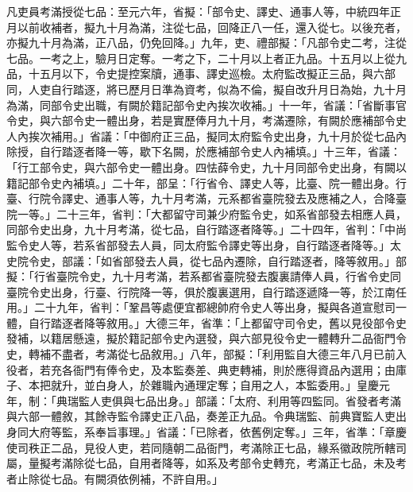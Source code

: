 \begin{pinyinscope}
 凡吏員考滿授從七品：至元六年，省擬：「部令史、譯史、通事人等，中統四年正月以前收補者，擬九十月為滿，注從七品，回降正八一任，還入從七。以後充者，亦擬九十月為滿，正八品，仍免回降。」九年，吏、禮部擬：「凡部令史二考，注從七品。一考之上，驗月日定奪。一考之下，二十月以上者正九品。十五月以上從九品，十五月以下，令史提控案牘，通事、譯史巡檢。太府監改擬正三品，與六部同，人吏自行踏逐，將已歷月日準為資考，似為不倫，擬自改升月日為始，九十月為滿，同部令史出職，有闕於籍記部令史內挨次收補。」十一年，省議：「省斷事官令史，與六部令史一體出身，若是實歷俸月九十月，考滿遷除，有闕於應補部令史人內挨次補用。」省議：「中御府正三品，擬同太府監令史出身，九十月於從七品內除授，自行踏逐者降一等，歇下名闕，於應補部令史人內補填。」十三年，省議：「行工部令史，與六部令史一體出身。四怯薛令史，九十月同部令史出身，有闕以籍記部令史內補填。」二十年，部呈：「行省令、譯史人等，比臺、院一體出身。行臺、行院令譯史、通事人等，九十月考滿，元系都省臺院發去及應補之人，合降臺院一等。」二十三年，省判：「大都留守司兼少府監令史，如系省部發去相應人員，同部令史出身，九十月考滿，從七品，自行踏逐者降等。」二十四年，省判：「中尚監令史人等，若系省部發去人員，同太府監令譯史等出身，自行踏逐者降等。」太史院令史，部議：「如省部發去人員，從七品內遷除，自行踏逐者，降等敘用。」部擬：「行省臺院令史，九十月考滿，若系都省臺院發去腹裏請俸人員，行省令史同臺院令史出身，行臺、行院降一等，俱於腹裏選用，自行踏逐遞降一等，於江南任用。」二十九年，省判：「鞏昌等處便宜都總帥府令史人等出身，擬與各道宣慰司一體，自行踏逐者降等敘用。」大德三年，省準：「上都留守司令史，舊以見役部令史發補，以籍居懸遠，擬於籍記部令史內選發，與六部見役令史一體轉升二品衙門令史，轉補不盡者，考滿從七品敘用。」八年，部擬：「利用監自大德三年八月已前入役者，若充各衙門有俸令史，及本監奏差、典吏轉補，則於應得資品內選用；由庫子、本把就升，並白身人，於雜職內通理定奪；自用之人，本監委用。」皇慶元年，制：「典瑞監人吏俱與七品出身。」部議：「太府、利用等四監同。省發者考滿與六部一體敘，其餘寺監令譯史正八品，奏差正九品。令典瑞監、前典寶監人吏出身同大府等監，系奉旨事理。」省議：「已除者，依舊例定奪。」三年，省準：「章慶使司秩正二品，見役人吏，若同隨朝二品衙門，考滿除正七品，緣系徽政院所轄司屬，量擬考滿除從七品，自用者降等，如系及考部令史轉充，考滿正七品，未及考者止除從七品。有闕須依例補，不許自用。」




\end{pinyinscope}
